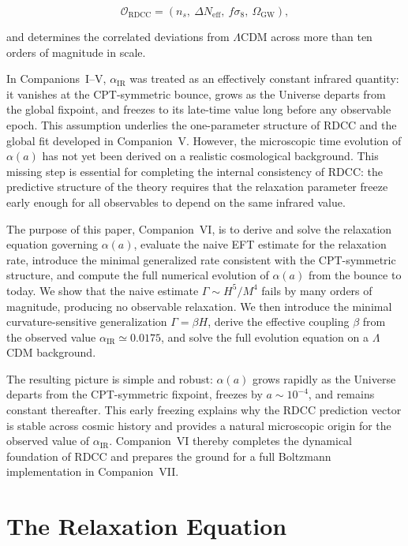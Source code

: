 \documentclass[11pt,a4paper]{article}
\begin{document}
\[
\mathcal{O}_{\mathrm{RDCC}} = (n_s,\ \Delta N_{\mathrm{eff}},\ f\sigma_8,\ \Omega_{\mathrm{GW}}),
\]


and determines the correlated deviations from $\Lambda$CDM across more than ten orders of
magnitude in scale.

In Companions~I–V, $\alpha_{\mathrm{IR}}$ was treated as an effectively constant infrared quantity:
it vanishes at the CPT-symmetric bounce, grows as the Universe departs from the global
fixpoint, and freezes to its late-time value long before any observable epoch. This assumption
underlies the one-parameter structure of RDCC and the global fit developed in Companion~V.
However, the microscopic time evolution of $\alpha(a)$ has not yet been derived on a realistic
cosmological background. This missing step is essential for completing the internal consistency
of RDCC: the predictive structure of the theory requires that the relaxation parameter freeze
early enough for all observables to depend on the same infrared value.

The purpose of this paper, Companion~VI, is to derive and solve the relaxation equation
governing $\alpha(a)$, evaluate the naive EFT estimate for the relaxation rate, introduce the
minimal generalized rate consistent with the CPT-symmetric structure, and compute the full
numerical evolution of $\alpha(a)$ from the bounce to today. We show that the naive estimate
$\Gamma \sim H^5/M^4$ fails by many orders of magnitude, producing no observable relaxation.
We then introduce the minimal curvature-sensitive generalization $\Gamma = \beta H$, derive the
effective coupling $\beta$ from the observed value $\alpha_{\mathrm{IR}} \simeq 0.0175$, and solve the
full evolution equation on a $\Lambda$CDM background.

The resulting picture is simple and robust: $\alpha(a)$ grows rapidly as the Universe departs
from the CPT-symmetric fixpoint, freezes by $a \sim 10^{-4}$, and remains constant thereafter.
This early freezing explains why the RDCC prediction vector is stable across cosmic history and
provides a natural microscopic origin for the observed value of $\alpha_{\mathrm{IR}}$. Companion~VI
thereby completes the dynamical foundation of RDCC and prepares the ground for a full
Boltzmann implementation in Companion~VII.

\section{The Relaxation Equation}
\end{document}
